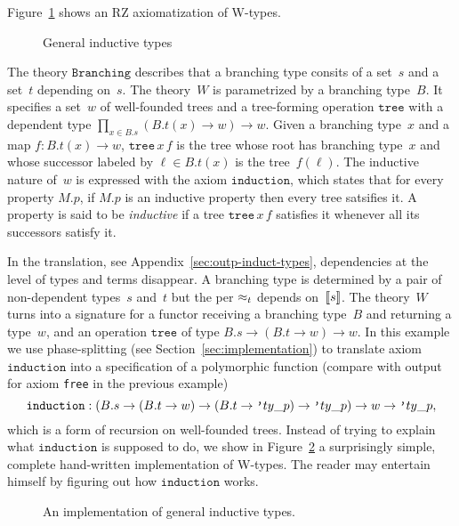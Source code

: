 Figure~\ref{fig:wtype} shows an RZ axiomatization of W-types.
%
\begin{figure}
  \centering
  \caption{General inductive types}
  \label{fig:wtype}
\end{figure}
%
The theory $\mathtt{Branching}$ describes that a branching type
consits of a set~$s$ and a set~$t$ depending on~$s$. The theory~$W$ is
parametrized by a branching type~$B$. It specifies a set~$w$ of
well-founded trees and a tree-forming operation $\mathtt{tree}$ with a
dependent type $\prod_{x \in B.s} (B.t(x) \to w) \to w$. Given a
branching type~$x$ and a map $f : B.t(x) \to w$, $\mathtt{tree}\,x\,f$
is the tree whose root has branching type~$x$ and whose successor
labeled by $\ell \in B.t(x)$ is the tree~$f(\ell)$. The inductive
nature of~$w$ is expressed with the axiom $\mathtt{induction}$, which
states that for every property $M.p$, if $M.p$ is an inductive
property then every tree satsifies it. A property is said to be
\emph{inductive} if a tree $\mathtt{tree}\,x\,f$ satisfies it whenever
all its successors satisfy it.

In the translation, see Appendix~\ref{sec:outp-induct-types},
dependencies at the level of types and terms disappear. A branching
type is determined by a pair of non-dependent types~$s$ and~$t$ but
the per $\approx_t$ depends on~$[\![s]\!]$. The theory~$W$ turns into a
signature for a functor receiving a branching type~$B$ and returning a
type~$w$, and an operation $\mathtt{tree}$ of type $B.s \to (B.t \to
w) \to w$. In this example we use phase-splitting (see
Section~\ref{sec:implementation}) to translate axiom
$\mathtt{induction}$ into a specification of a polymorphic function
(compare with output for axiom \texttt{free} in the previous example)
%
\begin{equation*}
  \mathtt{induction}:
  (B.s \to (B.t \to w) \to (B.t \to \poly{ty\_p}) \to \poly{ty\_p}) \to w \to \poly{ty\_p},
\end{equation*}
%
which is a form of recursion on well-founded trees. Instead of trying
to explain what $\mathtt{induction}$ is supposed to do, we show in
Figure~\ref{fig:wtype-implementation} a surprisingly simple, complete
hand-written implementation of W-types. The reader may entertain
himself by figuring out how $\mathtt{induction}$ works.
%
\begin{figure}
  \centering
  \caption{An implementation of general inductive types.}
  \label{fig:wtype-implementation}
\end{figure}


